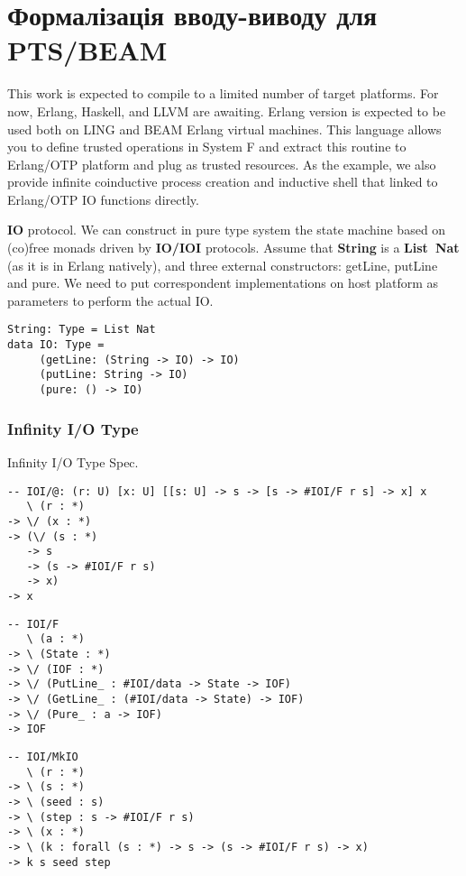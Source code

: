 \newpage
\section{Формалізація вводу-виводу для PTS/BEAM}

This work is expected to compile to a limited number of target platforms.
For now, Erlang, Haskell, and LLVM are awaiting.
Erlang version is expected to be used both on LING and BEAM Erlang virtual machines.
This language allows you to define trusted operations in System F and extract this routine to Erlang/OTP platform and plug as trusted resources.
As the example, we also provide infinite coinductive process creation and inductive shell that linked to Erlang/OTP IO functions directly.

\textbf{IO} protocol.
We can construct in pure type system the state machine based on (co)free monads driven by \textbf{IO/IOI} protocols.
Assume that \textbf{String} is a \textbf{List\ Nat} (as it is in Erlang natively), and three external constructors: getLine, putLine and pure.
We need to put correspondent implementations on host platform as parameters to perform the actual IO.

\begin{lstlisting}
String: Type = List Nat
data IO: Type =
     (getLine: (String -> IO) -> IO)
     (putLine: String -> IO)
     (pure: () -> IO)
\end{lstlisting}

\subsubsection{Infinity I/O Type}

Infinity I/O Type Spec.

\begin{lstlisting}
-- IOI/@: (r: U) [x: U] [[s: U] -> s -> [s -> #IOI/F r s] -> x] x
   \ (r : *)
-> \/ (x : *)
-> (\/ (s : *)
   -> s
   -> (s -> #IOI/F r s)
   -> x)
-> x
\end{lstlisting}

\begin{lstlisting}
-- IOI/F
   \ (a : *)
-> \ (State : *)
-> \/ (IOF : *)
-> \/ (PutLine_ : #IOI/data -> State -> IOF)
-> \/ (GetLine_ : (#IOI/data -> State) -> IOF)
-> \/ (Pure_ : a -> IOF)
-> IOF
\end{lstlisting}

\begin{lstlisting}
-- IOI/MkIO
   \ (r : *)
-> \ (s : *)
-> \ (seed : s)
-> \ (step : s -> #IOI/F r s)
-> \ (x : *)
-> \ (k : forall (s : *) -> s -> (s -> #IOI/F r s) -> x)
-> k s seed step
\end{lstlisting}

